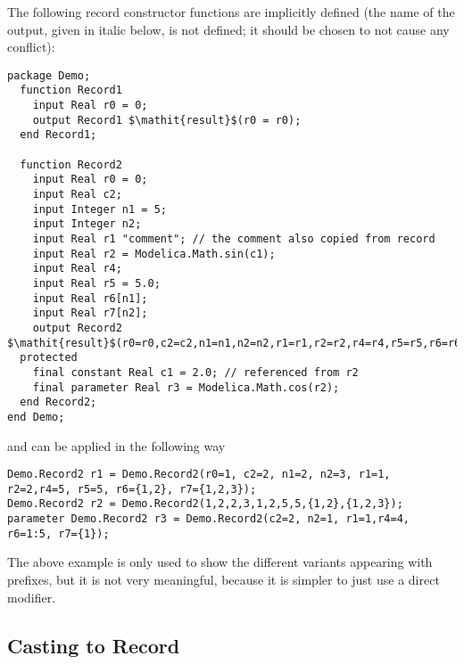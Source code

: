 \begin{nonnormative}
The following record constructor functions are implicitly defined
(the name of the output, given in italic below, is not defined; it
should be chosen to not cause any conflict):
\begin{lstlisting}[language=modelica,escapechar=!]
package Demo;
  function Record1
    input Real r0 = 0;
    output Record1 $\mathit{result}$(r0 = r0);
  end Record1;

  function Record2
    input Real r0 = 0;
    input Real c2;
    input Integer n1 = 5;
    input Integer n2;
    input Real r1 "comment"; // the comment also copied from record
    input Real r2 = Modelica.Math.sin(c1);
    input Real r4;
    input Real r5 = 5.0;
    input Real r6[n1];
    input Real r7[n2];
    output Record2 $\mathit{result}$(r0=r0,c2=c2,n1=n1,n2=n2,r1=r1,r2=r2,r4=r4,r5=r5,r6=r6,r7=r7);
  protected
    final constant Real c1 = 2.0; // referenced from r2
    final parameter Real r3 = Modelica.Math.cos(r2);
  end Record2;
end Demo;
\end{lstlisting}
and can be applied in the following way
\begin{lstlisting}[language=modelica]
Demo.Record2 r1 = Demo.Record2(r0=1, c2=2, n1=2, n2=3, r1=1, r2=2,r4=5, r5=5, r6={1,2}, r7={1,2,3});
Demo.Record2 r2 = Demo.Record2(1,2,2,3,1,2,5,5,{1,2},{1,2,3});
parameter Demo.Record2 r3 = Demo.Record2(c2=2, n2=1, r1=1,r4=4, r6=1:5, r7={1});
\end{lstlisting}

The above example is only used to show the different variants
appearing with prefixes, but it is not very meaningful, because it is
simpler to just use a direct modifier.
\end{nonnormative}

\subsection{Casting to Record}\label{casting-to-record}

